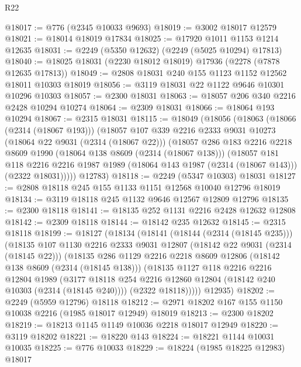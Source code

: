 \begin{lexlean}{R22}
\begin{coremodule}
@18017 := @776 (@2345 @10033 @9693)
@18019 := @3002 @18017 @12579
@18021 := @18014 @18019 @17834
@18025 := @17920 @1011 @1153 @1214 @12635
@18031 := @2249 (@5350 @12632) (@2249 (@5025 @10294) @17813)
@18040 := @18025 @18031 (@2230 @18012 @18019) @17936 (@2278 (@7878 @12635 @17813))
@18049 := @2808 @18031 @240 @155 @1123 @1152 @12562 @18011 @10303 @18019
@18056 := @3119 @18031 @22 @1122 @9646 @10301 @10296 @10303
@18057 := @2300 @18031
@18063 := @18057 @206 @340 @2216 @2428 @10294 @10274
@18064 := @2309 @18031
@18066 := @18064 @193 @10294
@18067 := @2315 @18031
@18115 := @18049
    (@18056
      (@18063
        (@18066 (@2314 (@18067 @193)))
        (@18057
          @107
          @339
          @2216
          @2333
          @9031
          @10273
          (@18064 @22 @9031 (@2314 (@18067 @22)))
          (@18057
            @286
            @183
            @2216
            @2218
            @8609
            @1990
            (@18064 @138 @8609 (@2314 (@18067 @138)))
            (@18057
              @181
              @118
              @2216
              @2216
              @1987
              @1989
              (@18064 @143 @1987 (@2314 (@18067 @143)))
              (@2322 @18031)))))
      @12783)
@18118 := @2249 (@5347 @10303) @18031
@18127 := @2808 @18118 @245 @155 @1133 @1151 @12568 @10040 @12796 @18019
@18134 := @3119 @18118 @245 @1132 @9646 @12567 @12809 @12796
@18135 := @2300 @18118
@18141 := @18135 @252 @1131 @2216 @2428 @12632 @12808
@18142 := @2309 @18118
@18144 := @18142 @235 @12632
@18145 := @2315 @18118
@18199 := @18127
    (@18134
      (@18141
        (@18144 (@2314 (@18145 @235)))
        (@18135
          @107
          @1130
          @2216
          @2333
          @9031
          @12807
          (@18142 @22 @9031 (@2314 (@18145 @22)))
          (@18135
            @286
            @1129
            @2216
            @2218
            @8609
            @12806
            (@18142 @138 @8609 (@2314 (@18145 @138)))
            (@18135
              @1127
              @118
              @2216
              @2216
              @12804
              @1989
              (@3177 @18118 @254 @2216 @12860 @12804 (@18142 @240 @10303 (@2314 (@18145 @240))))
              (@2322 @18118)))))
      @12935)
@18202 := @2249 (@5959 @12796) @18118
@18212 := @2971 @18202 @167 @155 @1150 @10038 @2216 (@1985 @18017 @12949) @18019
@18213 := @2300 @18202
@18219 := @18213 @1145 @1149 @10036 @2218 @18017 @12949
@18220 := @3119 @18202
@18221 := @18220 @143
@18224 := @18221 @1144 @10031 @10035
@18225 := @776 @10033
@18229 := @18224 (@1985 @18225 @12983) @18017

\end{coremodule}
\end{lexlean}
